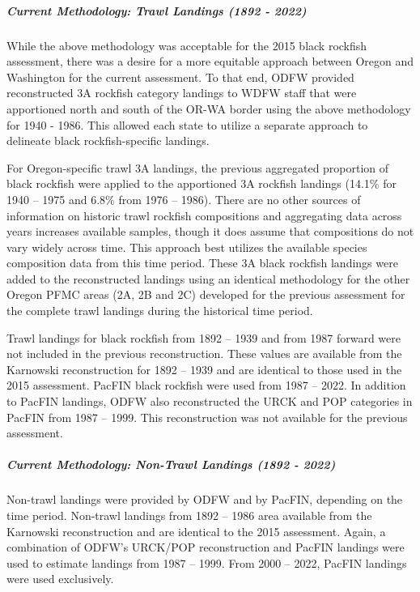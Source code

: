 \documentclass[11pt,
  english,
  letterpaper,
]{article}
\begin{document}
\hypertarget{current-methodology-trawl-landings-1892---2022}{%
\subparagraph{Current Methodology: Trawl Landings (1892 - 2022)}\label{current-methodology-trawl-landings-1892---2022}}

While the above methodology was acceptable for the 2015 black rockfish assessment, there was a desire for a more equitable approach between Oregon and Washington for the current assessment. To that end, ODFW provided reconstructed 3A rockfish category landings to WDFW staff that were apportioned north and south of the OR-WA border using the above methodology for 1940 - 1986. This allowed each state to utilize a separate approach to delineate black rockfish-specific landings.

For Oregon-specific trawl 3A landings, the previous aggregated proportion of black rockfish were applied to the apportioned 3A rockfish landings (14.1\% for 1940 -- 1975 and 6.8\% from 1976 -- 1986). There are no other sources of information on historic trawl rockfish compositions and aggregating data across years increases available samples, though it does assume that compositions do not vary widely across time. This approach best utilizes the available species composition data from this time period. These 3A black rockfish landings were added to the reconstructed landings using an identical methodology for the other Oregon PFMC areas (2A, 2B and 2C) developed for the previous assessment for the complete trawl landings during the historical time period.

Trawl landings for black rockfish from 1892 -- 1939 and from 1987 forward were not included in the previous reconstruction. These values are available from the Karnowski reconstruction for 1892 -- 1939 and are identical to those used in the 2015 assessment. PacFIN black rockfish were used from 1987 -- 2022. In addition to PacFIN landings, ODFW also reconstructed the URCK and POP categories in PacFIN from 1987 -- 1999. This reconstruction was not available for the previous assessment.

\hypertarget{current-methodology-non-trawl-landings-1892---2022}{%
\subparagraph{Current Methodology: Non-Trawl Landings (1892 - 2022)}\label{current-methodology-non-trawl-landings-1892---2022}}

Non-trawl landings were provided by ODFW and by PacFIN, depending on the time period. Non-trawl landings from 1892 -- 1986 area available from the Karnowski reconstruction and are identical to the 2015 assessment. Again, a combination of ODFW's URCK/POP reconstruction and PacFIN landings were used to estimate landings from 1987 -- 1999. From 2000 -- 2022, PacFIN landings were used exclusively.
\end{document}
